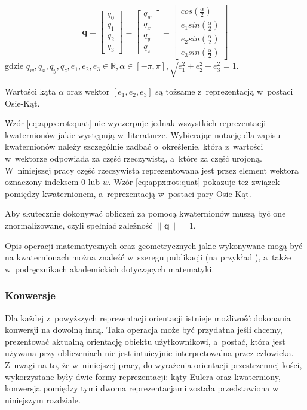 \begin{equation}
	\label{eq:appx:rot:quat}
	\mathbf{q} =
	\begin{bmatrix}
		q_0 \\
		q_1 \\
		q_2 \\
		q_3 
	\end{bmatrix} 
	= 	
	\begin{bmatrix}
		q_w \\
		q_x \\
		q_y \\
		q_z 
	\end{bmatrix} 
	= 
	\begin{bmatrix}
		cos(\frac{\alpha}{2})    \\
		e_1sin(\frac{\alpha}{2}) \\
		e_2sin(\frac{\alpha}{2}) \\
		e_3sin(\frac{\alpha}{2}) 
	\end{bmatrix}
\end{equation}
gdzie $q_w,q_x,q_y,q_z,e_1,e_2,e_3 \in \mathbb{R}, \alpha \in [-\pi, \pi], \sqrt{e_1^2 + e_2^2 + e_3^2} = 1$.
																													
Wartości kąta $\alpha$ oraz wektor $[e_1,e_2,e_3]$ są tożsame z~reprezentacją w~postaci Osie-Kąt.
																													
Wzór \ref{eq:appx:rot:quat} nie wyczerpuje jednak wszystkich reprezentacji kwaternionów jakie występują w~literaturze. Wybierając notację dla zapisu kwaternionów należy szczególnie zadbać o~określenie, która z~wartości w~wektorze odpowiada za część rzeczywistą, a~które za część urojoną. W~niniejszej pracy część rzeczywista reprezentowana jest przez element wektora oznaczony indeksem $0$ lub $w$. Wzór \ref{eq:appx:rot:quat} pokazuje też związek pomiędzy kwaternionem, a~reprezentacją w~postaci pary Osie-Kąt.
																													
Aby skutecznie dokonywać obliczeń za pomocą kwaternionów muszą być one znormalizowane, czyli spełniać zależność $\|\mathbf{q}\| = 1$.
																													
Opis operacji matematycznych oraz geometrycznych jakie wykonywane mogą być na kwaternionach można znaleźć w~szeregu publikacji (na przykład \cite{Dantam2014}), a~także w~podręcznikach akademickich dotyczących matematyki.
																													
\subsubsection*{Konwersje}
Dla każdej z~powyższych reprezentacji orientacji istnieje możliwość dokonania konwersji na dowolną inną. Taka operacja może być przydatna jeśli chcemy, prezentować aktualną orientację obiektu użytkownikowi, a~postać, która jest używana przy obliczeniach nie jest intuicyjnie interpretowalna przez człowieka. Z~uwagi na to, że w~niniejszej pracy, do wyrażenia orientacji przestrzennej kości, wykorzystane były dwie formy reprezentacji: kąty Eulera oraz kwaterniony, konwersja pomiędzy tymi dwoma reprezentacjami została przedstawiona w niniejszym rozdziale.

